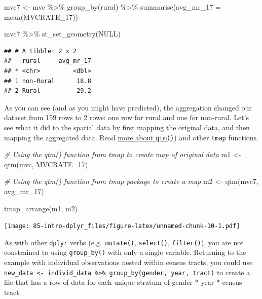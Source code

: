\documentclass[
]{book}
\newenvironment{Shaded}{\begin{snugshade}}{\end{snugshade}}
\newcommand{\AttributeTok}[1]{\textcolor[rgb]{0.77,0.63,0.00}{#1}}
\newcommand{\CommentTok}[1]{\textcolor[rgb]{0.56,0.35,0.01}{\textit{#1}}}
\newcommand{\ConstantTok}[1]{\textcolor[rgb]{0.00,0.00,0.00}{#1}}
\newcommand{\FunctionTok}[1]{\textcolor[rgb]{0.00,0.00,0.00}{#1}}
\newcommand{\NormalTok}[1]{#1}
\newcommand{\OtherTok}[1]{\textcolor[rgb]{0.56,0.35,0.01}{#1}}
\newcommand{\SpecialCharTok}[1]{\textcolor[rgb]{0.00,0.00,0.00}{#1}}
\newcommand{\StringTok}[1]{\textcolor[rgb]{0.31,0.60,0.02}{#1}}
\newenvironment{rmdtip}[1]
  {
  \begin{itemize}
  \renewcommand{\labelitemi}{
    \raisebox{-.7\height}[0pt][0pt]{
      {\setkeys{Gin}{width=3em,keepaspectratio}\texttt{[image: images/\#1]}}
    }
  }
  \setlength{\fboxsep}{1em}
  \begin{tip}
  \item
  }
  {
  \end{tip}
  \end{itemize}
  }
\begin{document}
\begin{Shaded}
\begin{Highlighting}[]
\NormalTok{mvc7 }\OtherTok{\textless{}{-}}\NormalTok{ mvc }\SpecialCharTok{\%\textgreater{}\%}
  \FunctionTok{group\_by}\NormalTok{(rural) }\SpecialCharTok{\%\textgreater{}\%}
  \FunctionTok{summarise}\NormalTok{(}\AttributeTok{avg\_mr\_17 =} \FunctionTok{mean}\NormalTok{(MVCRATE\_17))}

\NormalTok{mvc7 }\SpecialCharTok{\%\textgreater{}\%} \FunctionTok{st\_set\_geometry}\NormalTok{(}\ConstantTok{NULL}\NormalTok{)}
\end{Highlighting}
\end{Shaded}

\begin{verbatim}
## # A tibble: 2 x 2
##   rural     avg_mr_17
## * <chr>         <dbl>
## 1 non-Rural      18.8
## 2 Rural          29.2
\end{verbatim}

As you can see (and as you might have predicted), the aggregation changed our dataset from 159 rows to 2 rows: one row for rural and one for non-rural. Let's see what it did to the spatial data by first mapping the original data, and then mapping the aggregated data. Read \protect\hyperlink{qtm}{more about \texttt{qtm()}}) and other \texttt{tmap} functions.

\begin{Shaded}
\begin{Highlighting}[]
\CommentTok{\# Using the qtm() function from tmap to create map of original data}
\NormalTok{m1 }\OtherTok{\textless{}{-}} \FunctionTok{qtm}\NormalTok{(mvc, }\StringTok{\textquotesingle{}MVCRATE\_17\textquotesingle{}}\NormalTok{)}

\CommentTok{\# Using the qtm() function from tmap package to create a map}
\NormalTok{m2 }\OtherTok{\textless{}{-}} \FunctionTok{qtm}\NormalTok{(mvc7, }\StringTok{\textquotesingle{}avg\_mr\_17\textquotesingle{}}\NormalTok{)}

\FunctionTok{tmap\_arrange}\NormalTok{(m1, m2)}
\end{Highlighting}
\end{Shaded}

\texttt{[image: 85-intro-dplyr\_files/figure-latex/unnamed-chunk-10-1.pdf]}

\begin{rmdtip}{tip}
As with other \texttt{dplyr} verbs (e.g.~\texttt{mutate()}, \texttt{select()}, \texttt{filter()}), you are not constrained to using \texttt{group\_by()} with only a single variable. Returning to the example with individual observations nested within census tracts, you could use \texttt{new\_data\ \textless{}-\ individ\_data\ \%\textgreater{}\%\ group\_by(gender,\ year,\ tract)} to create a file that has a row of data for each unique stratum of gender * year * census tract.

\end{rmdtip}
\end{document}
